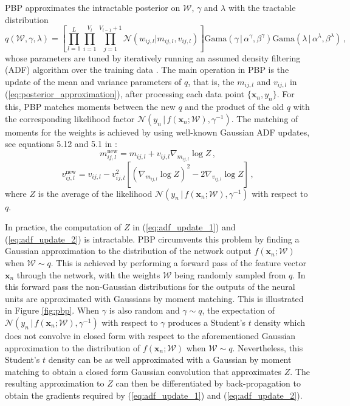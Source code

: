PBP approximates the intractable posterior on $\mathcal{W}$, $\gamma$ and $\lambda$ with the tractable distribution
\begin{equation}
q(\mathcal{W},\gamma, \lambda) = \left[ \prod_{l=1}^L\! \prod_{i=1}^{V_l}\! 
\prod_{j=1}^{V_{l\!-\!1}\!+\!1} \mathcal{N}(w_{ij,l}| m_{ij,l},v_{ij,l})\right ]
 \text{Gama}(\gamma \,|\, \alpha^\gamma, \beta^\gamma)
\text{Gama}(\lambda \,|\, \alpha^\lambda, \beta^\lambda)\,,\label{eq:posterior_approximation}
\end{equation}
whose parameters are tuned by iteratively running an assumed density filtering (ADF) algorithm over the training data \cite{Opper1998}. The main operation in PBP is the update of the mean and variance parameters of $q$, that is, the $m_{ij,l}$ and $v_{ij,l}$ in
(\ref{eq:posterior_approximation}), after processing each data point $\{\mathbf{x}_n,y_n\}$. For this, PBP matches moments between the new $q$ and the product of the old $q$ with the corresponding likelihood factor $\mathcal{N}(y_n \,|\, f(\mathbf{x}_n;\mathcal{W}),\gamma^{-1})$. The matching of moments for the weights is achieved by using well-known Gaussian ADF updates, see equations 5.12 and 5.1 in \cite{minka2001family}:
\begin{equation}
\label{eq:adf_update_1} m_{ij,l}^\text{new} =  m_{ij,l} + v_{ij,l} \nabla_{m_{ij,l}} \log Z \,,
\end{equation}
\begin{equation}
\label{eq:adf_update_2}v_{ij,l}^\text{new} = v_{ij,l} - v_{ij,l}^2 \left[ (\nabla_{m_{ij,l}} \log Z)^2 - 2 \nabla_{v_{ij,l}} \log Z \right]\,,
\end{equation}
where $Z$ is the average of the likelihood $\mathcal{N}(y_n\,|\, f(\mathbf{x}_n;\mathcal{W}),\gamma^{-1})$ with respect to $q$. 

In practice, the computation of $Z$ in (\ref{eq:adf_update_1}) and (\ref{eq:adf_update_2}) is intractable. PBP circumvents this problem by finding a Gaussian approximation to the distribution of the network output $f(\mathbf{x}_n;\mathcal{W})$ when $\mathcal{W} \sim q$. This is achieved by performing a forward pass of the feature vector $\mathbf{x}_n$ through the network, with the weights $\mathcal{W}$ being randomly sampled from $q$. In this forward pass the non-Gaussian distributions for the outputs of the neural units are approximated with Gaussians by moment matching. This is illustrated in Figure \ref{fig:pbp}. When $\gamma$ is also random and $\gamma\sim q$, the expectation of $\mathcal{N}(y_n \,|\, f(\mathbf{x}_n;\mathcal{W}),\gamma^{-1})$ with respect to $\gamma$ produces a Student's $t$ density which does not convolve in closed form with respect to the aforementioned Gaussian approximation to the distribution of $f(\mathbf{x}_n;\mathcal{W})$ when $\mathcal{W} \sim q$. Nevertheless, this Student's $t$ density can be as well approximated with a Gaussian by moment matching to obtain a closed form Gaussian convolution that approximates $Z$. The resulting approximation to $Z$ can then be differentiated by back-propagation to obtain the gradients required by (\ref{eq:adf_update_1}) and (\ref{eq:adf_update_2}).

